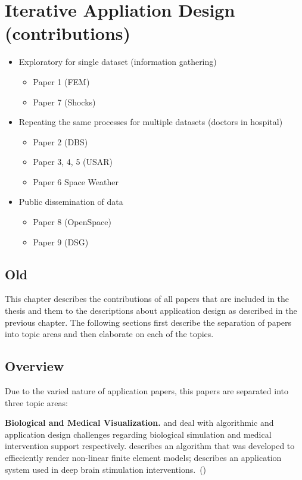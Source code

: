 \chapter{Iterative Appliation Design (contributions)}
\label{cha:contributions}

\begin{itemize}
  \item Exploratory for single dataset (information gathering)
  \begin{itemize}
    \item Paper 1 (FEM)
    \item Paper 7 (Shocks)
  \end{itemize}
  \item Repeating the same processes for multiple datasets (doctors in hospital)
  \begin{itemize}
    \item Paper 2 (DBS)
    \item Paper 3, 4, 5 (USAR)
    \item Paper 6 Space Weather
  \end{itemize}
  \item Public dissemination of data
  \begin{itemize}
    \item Paper 8 (OpenSpace)
    \item Paper 9 (DSG)
  \end{itemize}
\end{itemize}

\section*{Old}

This chapter describes the contributions of all papers that are included in the thesis and them to the descriptions about application design as described in the previous chapter. The following sections first describe the separation of papers into topic areas and then elaborate on each of the topics.

\section{Overview}
\label{contributions:overview}
Due to the varied nature of application papers, this papers are separated into three topic areas:

\textbf{Biological and Medical Visualization. }  and  deal with algorithmic and application design challenges regarding biological simulation and medical intervention support respectively.  describes an algorithm that was developed to effieciently render non-linear finite element models;  describes an application system used in deep brain stimulation interventions.~()

